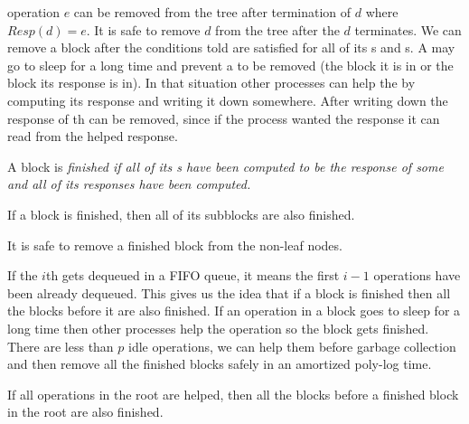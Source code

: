 %

 operation $e$ can be removed from the tree after termination of  $d$ where $Resp(d)=e$. It is safe to remove  $d$ from the tree after the $d$ terminates. We can remove a block after the conditions told are satisfied for all of its s and s. A  may go to sleep for a long time and prevent a  to be removed (the block it is in or the block its response is in). In that situation other processes can help the  by computing its response and writing it down somewhere. After writing down the response of th  can be removed, since if the process wanted the response it can read from the helped response.

\begin{definition}
A block  is \it{finished} if all of its s have been computed to be the response of some  and all of its  responses have been computed.  
\end{definition}

\begin{corollary}
If a block is finished, then all of its subblocks are also finished.  
\end{corollary}

\begin{lemma}
It is safe to remove a finished block from the non-leaf nodes.
\end{lemma}

If the $i$th  gets dequeued in a FIFO queue, it means the first $i-1$  operations have been already dequeued. This gives us the idea that if a block is finished then all the blocks before it are also finished. If an operation in a block goes to sleep for a long time then other processes help the operation so the block gets finished. There are less than $p$ idle operations, we can help them before garbage collection and then remove all the finished blocks safely in an amortized poly-log time.

\begin{lemma}
    If all  operations in the root are helped, then all the blocks before a finished block in the root are also finished.
\end{lemma}

